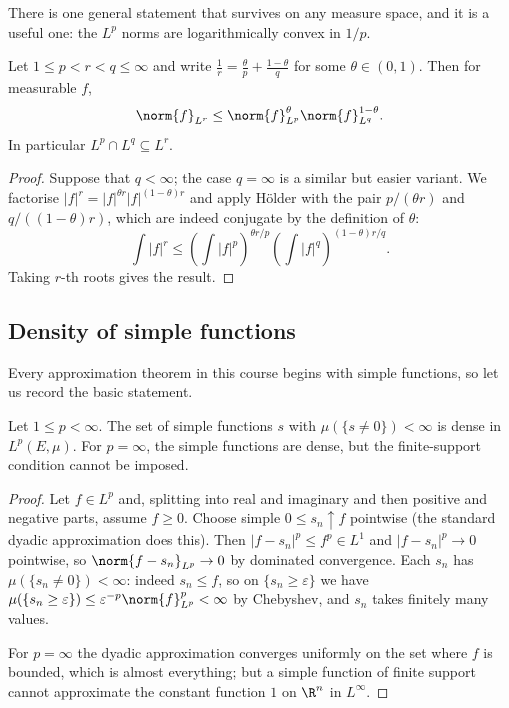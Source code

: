 There is one general statement that survives on any measure space, and it is a useful one: the $L^p$ norms are logarithmically convex in $1/p$.

\begin{proposition}[Interpolation]\label{prop:interp}
	Let $1 \le p < r < q \le \infty$ and write $\frac 1r = \frac{\theta}{p} + \frac{1-\theta}{q}$ for some $\theta \in (0,1)$. Then for measurable $f$,
	$$\norm{f}_{L^r} \le \norm{f}_{L^p}^{\theta} \norm{f}_{L^q}^{1-\theta}.$$
	In particular $L^p \cap L^q \subseteq L^r$.
\end{proposition}

\begin{proof}
	Suppose that $q < \infty$; the case $q = \infty$ is a similar but easier variant. We factorise $|f|^r = |f|^{\theta r} |f|^{(1-\theta)r}$ and apply H\"older with the pair $p/(\theta r)$ and $q/((1-\theta)r)$, which are indeed conjugate by the definition of $\theta$:
	$$\int |f|^r \le \left( \int |f|^p \right)^{\theta r / p} \left( \int |f|^q \right)^{(1-\theta) r/q}.$$
	Taking $r$-th roots gives the result.
\end{proof}

\subsection{Density of simple functions}

Every approximation theorem in this course begins with simple functions, so let us record the basic statement.

\begin{proposition}\label{prop:simpledense}
	Let $1 \le p < \infty$. The set of simple functions $s$ with $\mu(\{s \ne 0\}) < \infty$ is dense in $L^p(E,\mu)$. For $p = \infty$, the simple functions are dense, but the finite-support condition cannot be imposed.
\end{proposition}

\begin{proof}
	Let $f \in L^p$ and, splitting into real and imaginary and then positive and negative parts, assume $f \ge 0$. Choose simple $0 \le s_n \uparrow f$ pointwise (the standard dyadic approximation does this). Then $|f - s_n|^p \le f^p \in L^1$ and $|f-s_n|^p \to 0$ pointwise, so $\norm{f - s_n}_{L^p} \to 0$ by dominated convergence. Each $s_n$ has $\mu(\{s_n \ne 0\}) < \infty$: indeed $s_n \le f$, so on $\{s_n \ge \varepsilon\}$ we have $\mu(\{s_n \ge \varepsilon\}) \le \varepsilon^{-p}\norm{f}^p_{L^p} < \infty$ by Chebyshev, and $s_n$ takes finitely many values.

	For $p = \infty$ the dyadic approximation converges uniformly on the set where $f$ is bounded, which is almost everything; but a simple function of finite support cannot approximate the constant function $1$ on $\R^n$ in $L^\infty$.
\end{proof}


